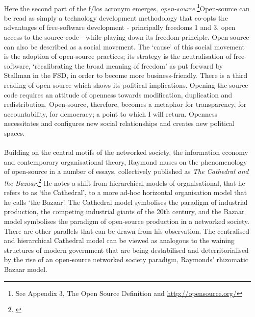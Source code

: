 \paragraph{}Here the second part of the f/los acronym emerges, \textit{open-source}.\footnote{See Appendix 3, The Open Source Definition and \url{http://opensource.org/}}Open-source can be read as simply a technology development methodology that co-opts the advantages of free-software development - principally freedoms 1 and 3, open access to the source-code -  while playing down its freedom principle. Open-source can also be described as a social movement. The `cause' of this social movement is the adoption of open-source 
practices; its strategy is the neutralisation of free-software, `recalibrating the broad meaning of freedom' as put forward by Stallman in the FSD, in order to become more business-friendly. There is a third reading of open-source which shows its political implications. Opening the source code requires an attitude of openness towards modification, duplication and redistribution. Open-source, therefore, becomes a metaphor for transparency, for accountability, for democracy; a point to which I will return. Openness necessitates and configures new social relationships and creates new political spaces.

\paragraph{}Building on the central motifs of the networked society, the information economy and contemporary organisational theory, Raymond muses on the phenomenology of open-source in a number of essays, collectively published as \textit{The Cathedral and the Bazaar}.\footnote{\cite{raymond:1999catb}} He notes a shift from hierarchical models of organisational, that he refers to as `the Cathedral', to a more ad-hoc horizontal organisation model that he calls `the Bazaar'. The Cathedral model symbolises the paradigm of industrial production, the competing industrial giants of the 20th century, and the Bazaar model symbolises the paradigm of open-source production in a networked society. There are other parallels that can be drawn from his observation. The centralised and hierarchical Cathedral model can be viewed as analogous to the waining structures of modern government that are being destabilised and deterritorialised by the rise of an open-source networked society paradigm, Raymonds' rhizomatic Bazaar model. 

